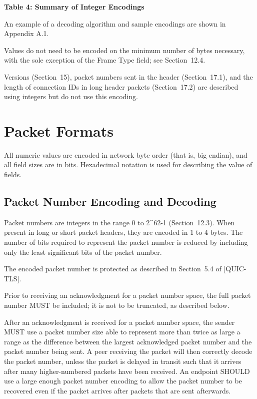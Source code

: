 \documentclass{article}
\begin{document}
\begin{center}
\textbf{Table 4: Summary of Integer Encodings}
\end{center}

An example of a decoding algorithm and sample encodings are shown in Appendix A.1.

Values do not need to be encoded on the minimum number of bytes necessary, with the sole exception of the Frame Type field; see Section~12.4.

Versions (Section~15), packet numbers sent in the header (Section~17.1), and the length of connection IDs in long header packets (Section~17.2) are described using integers but do not use this encoding.

\section{Packet Formats}

All numeric values are encoded in network byte order (that is, big endian), and all field sizes are in bits.  Hexadecimal notation is used for describing the value of fields.

\subsection{Packet Number Encoding and Decoding}

Packet numbers are integers in the range 0 to 2\textasciicircum{}62-1 (Section~12.3). When present in long or short packet headers, they are encoded in 1 to 4 bytes.  The number of bits required to represent the packet number is reduced by including only the least significant bits of the packet number.

The encoded packet number is protected as described in Section~5.4 of [QUIC-TLS].

Prior to receiving an acknowledgment for a packet number space, the full packet number MUST be included; it is not to be truncated, as described below.

After an acknowledgment is received for a packet number space, the sender MUST use a packet number size able to represent more than twice as large a range as the difference between the largest acknowledged packet number and the packet number being sent.  A peer receiving the packet will then correctly decode the packet number, unless the packet is delayed in transit such that it arrives after many higher-numbered packets have been received.  An endpoint SHOULD use a large enough packet number encoding to allow the packet number to be recovered even if the packet arrives after packets that are sent afterwards.
\end{document}

